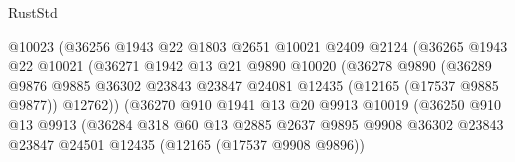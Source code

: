 \begin{lexlean}{RustStd}
\begin{coremodule}
                                @10023
                                (@36256
                                  @1943
                                  @22
                                  @1803
                                  @2651
                                  @10021
                                  @2409
                                  @2124
                                  (@36265
                                    @1943
                                    @22
                                    @10021
                                    (@36271
                                      @1942
                                      @13
                                      @21
                                      @9890
                                      @10020
                                      (@36278
                                        @9890
                                        (@36289
                                          @9876
                                          @9885
                                          @36302
                                          @23843
                                          @23847
                                          @24081
                                          @12435
                                          (@12165 (@17537 @9885 @9877))
                                          @12762))
                                      (@36270
                                        @910
                                        @1941
                                        @13
                                        @20
                                        @9913
                                        @10019
                                        (@36250
                                          @910
                                          @13
                                          @9913
                                          (@36284
                                            @318
                                            @60
                                            @13
                                            @2885
                                            @2637
                                            @9895
                                            @9908
                                            @36302
                                            @23843
                                            @23847
                                            @24501
                                            @12435
                                            (@12165 (@17537 @9908 @9896))

\end{coremodule}
\end{lexlean}
